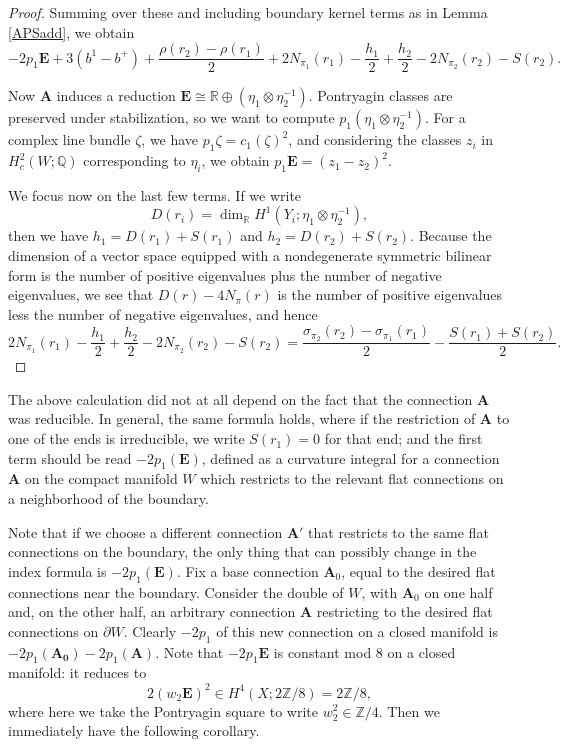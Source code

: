 \documentclass{memo-l}
\theoremstyle{definition}
\theoremstyle{remark}
\numberwithin{section}{chapter}
\numberwithin{equation}{chapter}
\begin{document}
\begin{proof}
Summing over these and including boundary kernel terms as in Lemma \ref{APSadd}, we obtain $$-2p_1 \mathbf{E} + 3(b^1 - b^+) + \frac{\rho(r_2) - \rho(r_1)}{2} + 2N_{\pi_1}(r_1) - \frac{h_1}{2} + \frac{h_2}{2} - 2N_{\pi_2}(r_2) - S(r_2).$$ 

Now $\mathbf{A}$ induces a reduction $\mathbf{E} \cong \mathbb R \oplus (\eta_1 \otimes \eta_2^{-1})$. Pontryagin classes are preserved under stabilization, so we want to compute $p_1(\eta_1 \otimes \eta_2^{-1})$. For a complex line bundle $\zeta$, we have $p_1 \zeta = c_1(\zeta)^2$, and considering the classes $z_i$ in $H^2_c(W;\mathbb Q)$ corresponding to $\eta_i$, we obtain $p_1 \mathbf{E} = (z_1 - z_2)^2$. 

We focus now on the last few terms. If we write 
$$D(r_i) = \dim_{\mathbb R} H^1(Y_i;\eta_1 \otimes \eta_2^{-1}),$$ 
then we have $h_1 = D(r_1) + S(r_1)$ and $h_2 = D(r_2) + S(r_2)$. Because the dimension of a vector space equipped with a nondegenerate symmetric bilinear form is the number of positive eigenvalues plus the number of negative eigenvalues, we see that $D(r)-4N_{\pi}(r)$ is the number of positive eigenvalues less the number of negative eigenvalues, and hence $$2N_{\pi_1}(r_1) - \frac{h_1}{2} + \frac{h_2}{2} - 2N_{\pi_2}(r_2) - S(r_2) = \frac{\sigma_{\pi_2}(r_2) - \sigma_{\pi_1}(r_1)}{2} - \frac{S(r_1) + S(r_2)}{2}.$$ 
\end{proof}

The above calculation did not at all depend on the fact that the connection $\mathbf{A}$ was reducible. In general, the same formula holds, where if the restriction of $\mathbf{A}$ to one of the ends is irreducible, we write $S(r_1) = 0$ for that end; and the first term should be read $-2 p_1(\mathbf{E})$, defined as a curvature integral for a connection $\mathbf{A}$ on the compact manifold $W$ which restricts to the relevant flat connections on a neighborhood of the boundary. 

Note that if we choose a different connection $\mathbf{A}'$ that restricts to the same flat connections on the boundary, the only thing that can possibly change in the index formula is $-2 p_1(\mathbf{E})$. Fix a base connection $\mathbf{A}_0$, equal to the desired flat connections near the boundary. Consider the double of $W$, with $\mathbf{A}_0$ on one half and, on the other half, an arbitrary connection $\mathbf{A}$ restricting to the desired flat connections on $\partial W$. Clearly $-2p_1$ of this new connection on a closed manifold is $-2p_1(\mathbf{A_0}) -2p_1(\mathbf{A})$. Note that $-2 p_1 \mathbf{E}$ is constant mod $8$ on a closed manifold: it reduces to 
$$2(w_2 \mathbf{E})^2 \in H^4(X;2\mathbb Z/8) = 2\mathbb Z/8,$$
where here we take the Pontryagin square to write $w_2^2 \in \mathbb Z/4$. Then we immediately have the following corollary.
\end{document}
